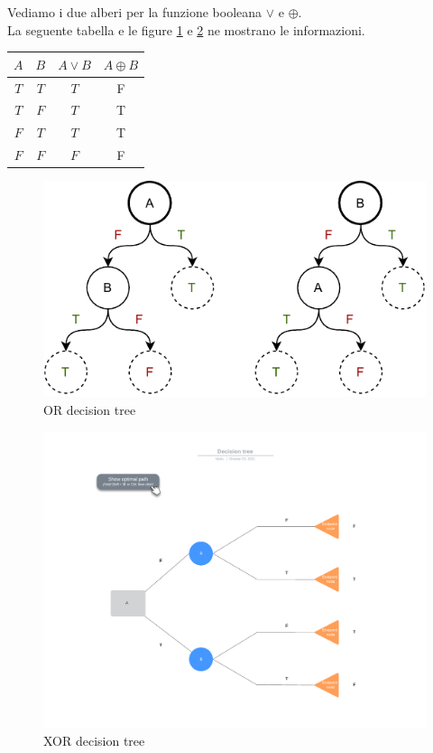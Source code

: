 \begin{esempio}
  Vediamo i due alberi per la funzione booleana $\lor$ e $\oplus$.\\
  La seguente tabella e le figure \ref{OR decision tree} e \ref{XOR decision tree} ne mostrano le informazioni.
  \begin{table}[H]
    \centering
    \begin{tabular}{c|c|c|c}
      $A$ & $B$ & $A\lor B$ & $A\oplus B$ \\
      \hline
      $T$ & $T$ & $T$ & F\\
      $T$ & $F$ & $T$ & T\\
      $F$ & $T$ & $T$ & T\\
      $F$ & $F$ & $F$ & F
    \end{tabular}
  \end{table}
  
  \begin{figure}[h]
    \centering
    \includegraphics[scale = 0.9]{img/dt1.pdf}
    \caption{OR decision tree}
    \label{OR decision tree}
  \end{figure}
 
  \begin{figure}[h]
    \centering
    \includegraphics[scale = 0.5]{img/XOR.pdf}
    \caption{XOR decision tree}
    \label{XOR decision tree}
  \end{figure}
\end{esempio}
